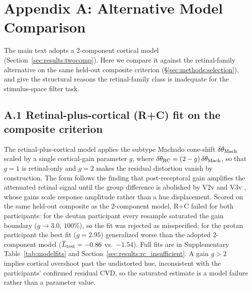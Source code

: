 
\section*{Appendix A: Alternative Model Comparison}
\label{app:altmodels}

The main text adopts a 2-component cortical model (Section~\ref{sec:results:twocomp}). Here we compare it against the retinal-family alternative on the same held-out composite criterion (\S\ref{sec:methods:selection}), and give the structural reasons the retinal-family class is inadequate for the stimulus-space filter task.

\subsection*{A.1 Retinal-plus-cortical (R+C) fit on the composite criterion}

The retinal-plus-cortical model applies the subtype Machado cone-shift $\delta\theta_{\rm Mach}$  scaled by a single cortical-gain parameter $g$, where $\delta\theta_{\rm RC} = (2 - g)\,\delta\theta_{\rm Mach}$, so that $g = 1$ is retinal-only and $g = 2$ makes the residual distortion vanish by construction. The form follows the finding that post-receptoral gain amplifies the attenuated retinal signal until the group difference is abolished by V2v and V3v , whose gains scale response amplitude rather than a hue displacement. Scored on the same held-out composite as the 2-component model, R+C failed for both participants: for the deutan participant every resample saturated the gain boundary ($g \to 3.0$, $100\%$), so the fit was rejected as misspecified; for the protan participant the best fit ($g = 2.95$) generalized worse than the adopted 2-component model ($\overline{L}_{\rm test} = -0.86$ vs.\ $-1.54$). Full fits are in Supplementary Table~\ref{tab:modelfits} and Section~\ref{sec:results:rc_insufficient}. A gain $g > 2$ implies cortical overshoot past the undistorted hue, inconsistent with the participants' confirmed residual CVD, so the saturated estimate is a model failure rather than a parameter value.

